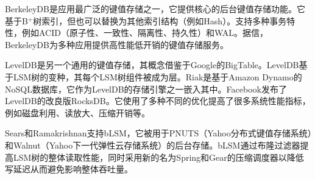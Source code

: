 BerkeleyDB是应用最广泛的键值存储之一，它提供核心的后台键值存储功能。它基于B$^+$树索引，但也可以替换为其他索引结构（例如Hash）。支持多种事务特性，例如ACID（原子性、一致性、隔离性、持久性）和WAL。据信，BerkeleyDB为多种应用提供高性能低开销的键值存储服务。

LevelDB是另一个通用的键值存储，其概念借鉴于Google的BigTable。LevelDB基于LSM树的变种，其每个LSM树组件被成为层。Riak是基于Amazon Dynamo的NoSQL数据库，它作为LevelDB的存储引擎之一嵌入其中。Facebook发布了LevelDB的改良版RocksDB。它使用了多种不同的优化提高了很多系统性能指标，例如磁盘利用、读放大、压缩开销等。

Sears和Ramakrishnan支持bLSM，它被用于PNUTS（Yahoo分布式键值存储系统）和Walnut（Yahoo下一代弹性云存储系统）的后台存储。bLSM通过布隆过滤器提高LSM树的整体读取性能，同时采用新的名为Spring和Gear的压缩调度器以降低写延迟从而避免影响整体吞吐量。